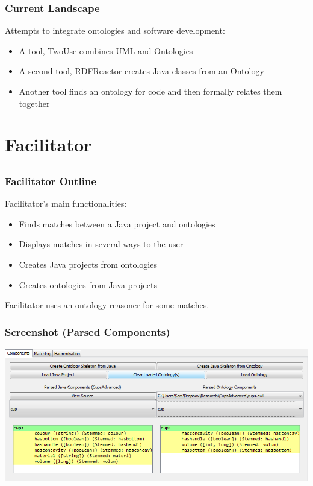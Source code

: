 \documentclass{beamer}
\begin{document}
\begin{frame}
  \frametitle{Current Landscape}
  Attempts to integrate ontologies and software development:
  \begin{itemize}
	\item A tool, TwoUse combines UML and Ontologies
    \item A second tool, RDFReactor creates Java classes from an Ontology
    \item Another tool finds an ontology for code and then formally relates them together
  \end{itemize}
\end{frame}

\section{Facilitator}
\subsection{}

\begin{frame}
\frametitle{Facilitator Outline}
Facilitator's main functionalities:
\begin{itemize}
\item Finds matches between a Java project and ontologies
\item Displays matches in several ways to the user
\item Creates Java projects from ontologies
\item Creates ontologies from Java projects
\end{itemize}
Facilitator uses an ontology reasoner for some matches.
\end{frame}

\begin{frame}
\frametitle{Screenshot (Parsed Components)}
\centerline{\includegraphics[width=\paperwidth]{ComponentsScreen}}
\end{frame}
\end{document}
